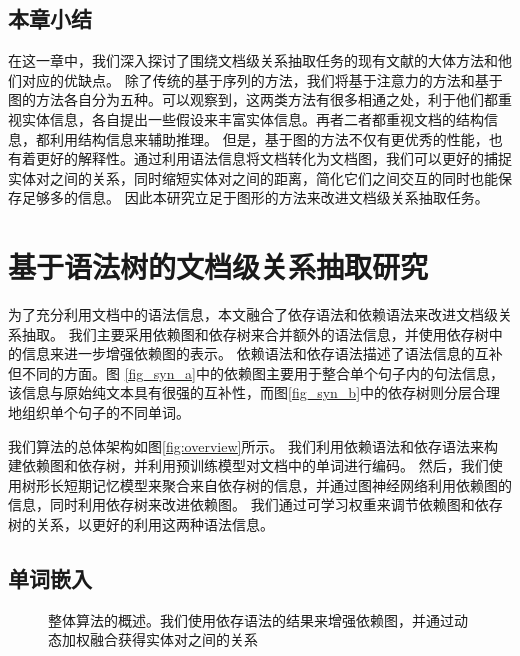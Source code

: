 \documentclass[bachelor]{thesis-uestc}
\begin{document}
\section{本章小结}

在这一章中，我们深入探讨了围绕文档级关系抽取任务的现有文献的大体方法和他们对应的优缺点。
除了传统的基于序列的方法，我们将基于注意力的方法和基于图的方法各自分为五种。可以观察到，这两类方法有很多相通之处，利于他们都重视实体信息，各自提出一些假设来丰富实体信息。再者二者都重视文档的结构信息，都利用结构信息来辅助推理。
但是，基于图的方法不仅有更优秀的性能，也有着更好的解释性。通过利用语法信息将文档转化为文档图，我们可以更好的捕捉实体对之间的关系，同时缩短实体对之间的距离，简化它们之间交互的同时也能保存足够多的信息。
因此本研究立足于图形的方法来改进文档级关系抽取任务。


\chapter{基于语法树的文档级关系抽取研究}
为了充分利用文档中的语法信息，本文融合了依存语法和依赖语法来改进文档级关系抽取。
我们主要采用依赖图和依存树来合并额外的语法信息，并使用依存树中的信息来进一步增强依赖图的表示。
依赖语法和依存语法描述了语法信息的互补但不同的方面。图 \ref{fig_syn_a}中的依赖图主要用于整合单个句子内的句法信息，该信息与原始纯文本具有很强的互补性，而图\ref{fig_syn_b}中的依存树则分层合理地组织单个句子的不同单词。\par

我们算法的总体架构如图\ref{fig:overview}所示。
我们利用依赖语法和依存语法来构建依赖图和依存树，并利用预训练模型对文档中的单词进行编码。
然后，我们使用树形长短期记忆模型来聚合来自依存树的信息，并通过图神经网络利用依赖图的信息，同时利用依存树来改进依赖图。
我们通过可学习权重来调节依赖图和依存树的关系，以更好的利用这两种语法信息。

\section{单词嵌入}
\begin{figure}[t]
    \caption{整体算法的概述。我们使用依存语法的结果来增强依赖图，并通过动态加权融合获得实体对之间的关系}
\end{figure}\label{fig:overview}
\end{document}
